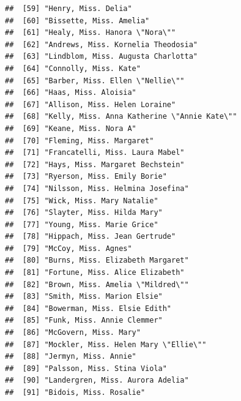 \documentclass[11pt,]{book}
\begin{document}
\begin{verbatim}
##  [59] "Henry, Miss. Delia"                                                   
##  [60] "Bissette, Miss. Amelia"                                               
##  [61] "Healy, Miss. Hanora \"Nora\""                                         
##  [62] "Andrews, Miss. Kornelia Theodosia"                                    
##  [63] "Lindblom, Miss. Augusta Charlotta"                                    
##  [64] "Connolly, Miss. Kate"                                                 
##  [65] "Barber, Miss. Ellen \"Nellie\""                                       
##  [66] "Haas, Miss. Aloisia"                                                  
##  [67] "Allison, Miss. Helen Loraine"                                         
##  [68] "Kelly, Miss. Anna Katherine \"Annie Kate\""                           
##  [69] "Keane, Miss. Nora A"                                                  
##  [70] "Fleming, Miss. Margaret"                                              
##  [71] "Francatelli, Miss. Laura Mabel"                                       
##  [72] "Hays, Miss. Margaret Bechstein"                                       
##  [73] "Ryerson, Miss. Emily Borie"                                           
##  [74] "Nilsson, Miss. Helmina Josefina"                                      
##  [75] "Wick, Miss. Mary Natalie"                                             
##  [76] "Slayter, Miss. Hilda Mary"                                            
##  [77] "Young, Miss. Marie Grice"                                             
##  [78] "Hippach, Miss. Jean Gertrude"                                         
##  [79] "McCoy, Miss. Agnes"                                                   
##  [80] "Burns, Miss. Elizabeth Margaret"                                      
##  [81] "Fortune, Miss. Alice Elizabeth"                                       
##  [82] "Brown, Miss. Amelia \"Mildred\""                                      
##  [83] "Smith, Miss. Marion Elsie"                                            
##  [84] "Bowerman, Miss. Elsie Edith"                                          
##  [85] "Funk, Miss. Annie Clemmer"                                            
##  [86] "McGovern, Miss. Mary"                                                 
##  [87] "Mockler, Miss. Helen Mary \"Ellie\""                                  
##  [88] "Jermyn, Miss. Annie"                                                  
##  [89] "Palsson, Miss. Stina Viola"                                           
##  [90] "Landergren, Miss. Aurora Adelia"                                      
##  [91] "Bidois, Miss. Rosalie"                                                

\end{verbatim}
\end{document}
